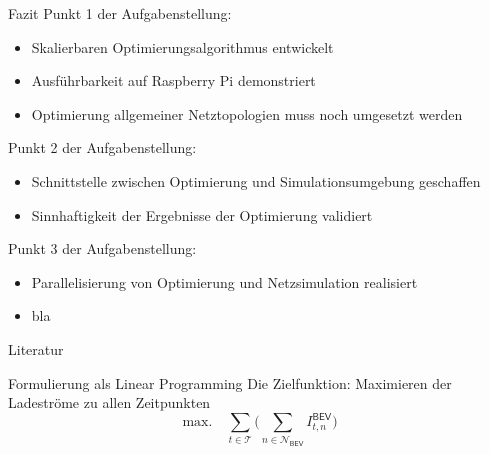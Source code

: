 \documentclass[aspectratio=169]{beamer}
\begin{document}
\begin{frame}{Fazit}
	Punkt 1 der Aufgabenstellung:
	\begin{itemize}
		\item Skalierbaren Optimierungsalgorithmus entwickelt
		\item Ausführbarkeit auf Raspberry Pi demonstriert
		\item Optimierung allgemeiner Netztopologien muss noch umgesetzt werden
	\end{itemize}\vspace{.5cm}
	Punkt 2 der Aufgabenstellung:
	\begin{itemize}
		\item Schnittstelle zwischen Optimierung und Simulationsumgebung
		geschaffen
		\item Sinnhaftigkeit der Ergebnisse der Optimierung validiert
	\end{itemize}\vspace{.5cm}
	Punkt 3 der Aufgabenstellung:
	\begin{itemize}
		\item Parallelisierung von Optimierung und Netzsimulation realisiert
		\item bla
	\end{itemize}
\end{frame}


\begin{frame}{Literatur}
	\printbibliography
\end{frame}


\begin{frame}{Formulierung als Linear Programming}
	Die Zielfunktion: Maximieren der Ladeströme zu allen Zeitpunkten
	\begin{equation*}
		\text{max.}\quad\sum_{t\in\mathcal{T}}\bigg(\sum_{n\in
		\mathcal{N_\mathsf{BEV}}}\!\!I^\mathsf{BEV}_{t,n}\bigg)
	\end{equation*}
\end{frame}
\end{document}
